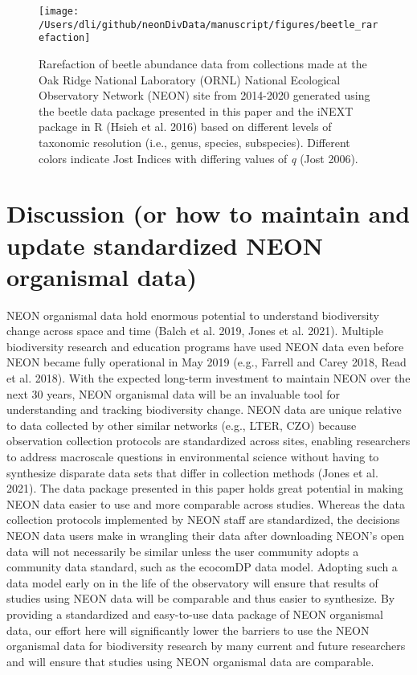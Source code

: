 \documentclass[
  12pt,
]{article}
\begin{document}
\begin{figure}

{\centering \texttt{[image: /Users/dli/github/neonDivData/manuscript/figures/beetle\_rarefaction]} 

}

\caption{Rarefaction of beetle abundance data from collections made at the Oak Ridge National Laboratory (ORNL) National Ecological Observatory Network (NEON) site from 2014-2020 generated using the beetle data package presented in this paper and the iNEXT package in R (Hsieh et al. 2016) based on different levels of taxonomic resolution (i.e., genus, species, subspecies). Different colors indicate Jost Indices with differing values of \emph{q} (Jost 2006).}\label{fig:Fig3Curve}
\end{figure}

\hypertarget{discussion-or-how-to-maintain-and-update-standardized-neon-organismal-data}{%
\section{Discussion (or how to maintain and update standardized NEON organismal data)}\label{discussion-or-how-to-maintain-and-update-standardized-neon-organismal-data}}

NEON organismal data hold enormous potential to understand biodiversity change across space and time (Balch et al. 2019, Jones et al. 2021). Multiple biodiversity research and education programs have used NEON data even before NEON became fully operational in May 2019 (e.g., Farrell and Carey 2018, Read et al. 2018). With the expected long-term investment to maintain NEON over the next 30 years, NEON organismal data will be an invaluable tool for understanding and tracking biodiversity change. NEON data are unique relative to data collected by other similar networks (e.g., LTER, CZO) because observation collection protocols are standardized across sites, enabling researchers to address macroscale questions in environmental science without having to synthesize disparate data sets that differ in collection methods (Jones et al. 2021). The data package presented in this paper holds great potential in making NEON data easier to use and more comparable across studies. Whereas the data collection protocols implemented by NEON staff are standardized, the decisions NEON data users make in wrangling their data after downloading NEON's open data will not necessarily be similar unless the user community adopts a community data standard, such as the ecocomDP data model. Adopting such a data model early on in the life of the observatory will ensure that results of studies using NEON data will be comparable and thus easier to synthesize. By providing a standardized and easy-to-use data package of NEON organismal data, our effort here will significantly lower the barriers to use the NEON organismal data for biodiversity research by many current and future researchers and will ensure that studies using NEON organismal data are comparable.
\end{document}
